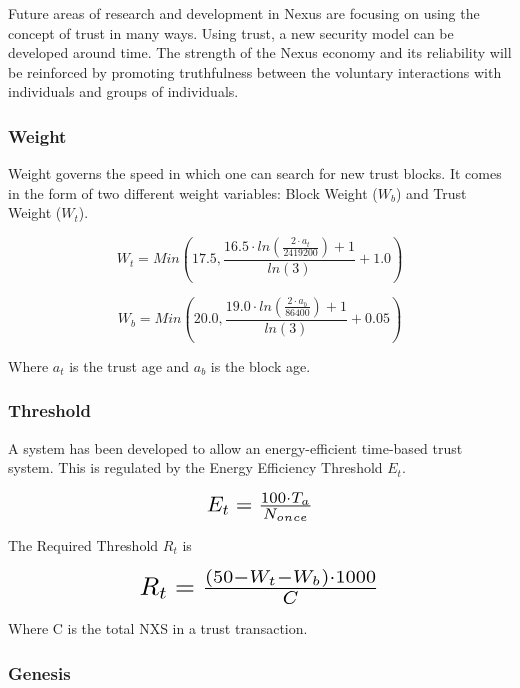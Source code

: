 \documentclass[11pt]{article}
\begin{document}
\noindent Future areas of research and development in Nexus are focusing on using the concept of trust in many ways.
Using trust, a new security model can be developed around time.
The strength of the Nexus economy and its reliability will be reinforced by promoting truthfulness between the voluntary interactions with individuals and groups of individuals.

\subsubsection{Weight}

Weight governs the speed in which one can search for new trust blocks. 
It comes in the form of two different weight variables: Block Weight ($W_b$) and Trust Weight ($W_t$).

\begin{equation}
W_{t} = Min(17.5, \frac{16.5 \cdot ln(\frac{2 \cdot a_t}{2419200}) + 1}{ln(3)} + 1.0)
\end{equation}

\begin{equation}
W_{b} = Min(20.0,\frac{19.0 \cdot ln(\frac{2 \cdot a_b}{86400}) + 1}{ln(3)} + 0.05)
\end{equation}

\noindent Where $a_t$ is the trust age and $a_b$ is the block age.

\subsubsection{Threshold}

A system has been developed to allow an energy-efficient time-based trust system.
This is regulated by the Energy Efficiency Threshold $E_t$.

\begin{equation}
\resizebox{.22\hsize}{!}{$E_{t} = \frac{100 \cdot T_{a}}{N_{once}}$}
\end{equation}

\pagebreak
The Required Threshold $R_t$ is

\begin{equation}
\resizebox{.5\hsize}{!}{$R_{t} = \frac{(50 - W_{t} - W_{b}) \cdot 1000}{C}$}
\end{equation}

Where C is the total NXS in a trust transaction.

\subsubsection{Genesis}
\end{document}
